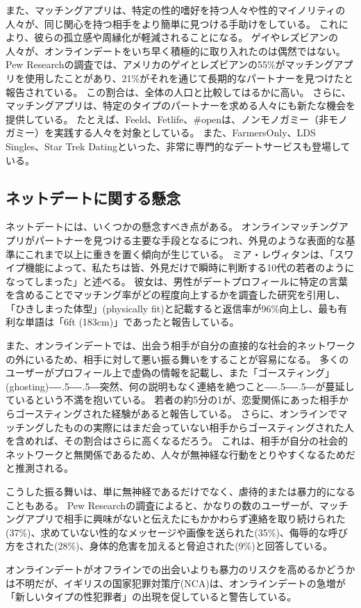 \documentclass[paper=a4,book,openany]{jlreq}
\newcommand{\ig}[1]{}           %
\def\DDASH{―\kern-.5\zw―\kern-.5\zw―} %
\begin{document}
また、マッチングアプリは、特定の性的嗜好を持つ人々や性的マイノリティの人々が、同じ関心を持つ相手をより簡単に見つける手助けをしている。
これにより、彼らの孤立感や周縁化が軽減されることになる。
ゲイやレズビアンの人々が、オンラインデートをいち早く積極的に取り入れたのは偶然ではない。
Pew Researchの調査では、アメリカのゲイとレズビアンの55\%がマッチングアプリを使用したことがあり、21\%がそれを通じて長期的なパートナーを見つけたと報告されている。
この割合は、全体の人口と比較してはるかに高い。
さらに、マッチングアプリは、特定のタイプのパートナーを求める人々にも新たな機会を提供している。
たとえば、Feeld、Fetlife、\#openは、ノンモノガミー（非モノガミー）を実践する人々を対象としている。
また、FarmersOnly、LDS Singles、Star Trek Datingといった、非常に専門的なデートサービスも登場している。

\subsection{ネットデートに関する懸念}

ネットデートには、いくつかの懸念すべき点がある。
オンラインマッチングアプリがパートナーを見つける主要な手段となるにつれ、外見のような表面的な基準にこれまで以上に重きを置く傾向が生じている。
ミア・レヴィタンは、「スワイプ機能によって、私たちは皆、外見だけで瞬時に判断する10代の若者のようになってしまった」と述べる。
彼女は、男性がデートプロフィールに特定の言葉を含めることでマッチング率がどの程度向上するかを調査した研究を引用し、「ひきしまった体型」(physically fit)と記載すると返信率が96\%向上し、最も有利な単語は「6ft (183cm)」であったと報告している\citep{levitan20:_futur_seduc_lond,dodgson18:_usin_thes_word}。

また、オンラインデートでは、出会う相手が自分の直接的な社会的ネットワークの外にいるため、相手に対して悪い振る舞いをすることが容易になる。
多くのユーザーがプロフィール上で虚偽の情報を記載し、また「ゴースティング」(ghosting){\DDASH}突然、何の説明もなく連絡を絶つこと{\DDASH}が蔓延しているという不満を抱いている。
若者の約5分の1が、恋愛関係にあった相手からゴースティングされた経験があると報告している\citep{yougov14:_poll_resul,navarro20:_psyc_corr_ghos_bread_exper}。
さらに、オンラインでマッチングしたものの実際にはまだ会っていない相手からゴースティングされた人を含めれば、その割合はさらに高くなるだろう。
これは、相手が自分の社会的ネットワークと無関係であるため、人々が無神経な行動をとりやすくなるためだと推測される。

こうした振る舞いは、単に無神経であるだけでなく、虐待的または暴力的になることもある。
Pew Researchの調査によると、かなりの数のユーザーが、マッチングアプリで相手に興味がないと伝えたにもかかわらず連絡を取り続けられた(37\%)、求めていない性的なメッセージや画像を送られた(35\%)、侮辱的な呼び方をされた(28\%)、身体的危害を加えると脅迫された(9\%)と回答している\citep{anderson20:_virt_down_onlin_datin}。
\ig{Monica Anderson}
オンラインデートがオフラインでの出会いよりも暴力のリスクを高めるかどうかは不明だが、イギリスの国家犯罪対策庁(NCA)は、オンラインデートの急増が「新しいタイプの性犯罪者」の出現を促していると警告している\citep{doria20:_are_datin_apps_safe_unsaf}。
\end{document}
